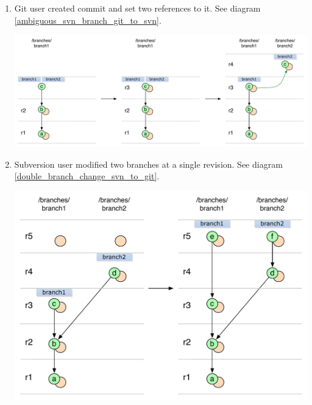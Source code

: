 \begin{enumerate}
\compactlist

\item Git user created commit and set two references to it. See diagram \ref{ambiguous_svn_branch_git_to_svn}.
\begin{center}
\includegraphics[width=\linewidth]{img/diagrams/ambiguous_svn_branch_git_to_svn.pdf}%
\label{ambiguous_svn_branch_git_to_svn}%
\end{center}

\item Subversion user modified two branches at a single revision. See diagram \ref{double_branch_change_svn_to_git}.
\begin{center}
\includegraphics[width=\linewidth]{img/diagrams/double_branch_change_svn_to_git.pdf}%
\label{double_branch_change_svn_to_git}%
\end{center}
\end{enumerate}

